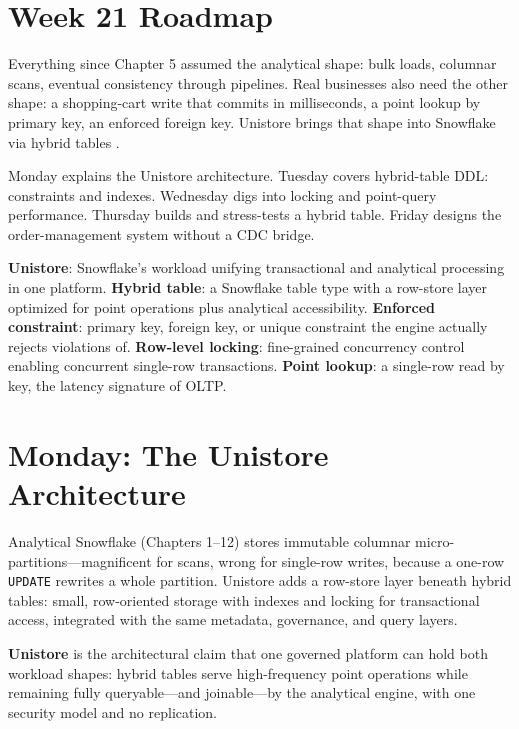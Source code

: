 \section{Week 21 Roadmap}
Everything since Chapter 5 assumed the analytical shape: bulk loads, columnar scans, eventual consistency through pipelines. Real businesses also need the other shape: a shopping-cart write that commits in milliseconds, a point lookup by primary key, an enforced foreign key. Unistore brings that shape into Snowflake via hybrid tables \cite{snowflakeHybridTablesDocs}.

Monday explains the Unistore architecture. Tuesday covers hybrid-table DDL: constraints and indexes. Wednesday digs into locking and point-query performance. Thursday builds and stress-tests a hybrid table. Friday designs the order-management system without a CDC bridge.

\begin{keyterms}
\textbf{Unistore}: Snowflake's workload unifying transactional and analytical processing in one platform.\quad
\textbf{Hybrid table}: a Snowflake table type with a row-store layer optimized for point operations plus analytical accessibility.\quad
\textbf{Enforced constraint}: primary key, foreign key, or unique constraint the engine actually rejects violations of.\quad
\textbf{Row-level locking}: fine-grained concurrency control enabling concurrent single-row transactions.\quad
\textbf{Point lookup}: a single-row read by key, the latency signature of OLTP.
\end{keyterms}

\section{Monday: The Unistore Architecture}
Analytical Snowflake (Chapters 1--12) stores immutable columnar micro-partitions---magnificent for scans, wrong for single-row writes, because a one-row \texttt{UPDATE} rewrites a whole partition. Unistore adds a row-store layer beneath hybrid tables: small, row-oriented storage with indexes and locking for transactional access, integrated with the same metadata, governance, and query layers.

\begin{definitionbox}
\textbf{Unistore} is the architectural claim that one governed platform can hold both workload shapes: hybrid tables serve high-frequency point operations while remaining fully queryable---and joinable---by the analytical engine, with one security model and no replication.
\end{definitionbox}

